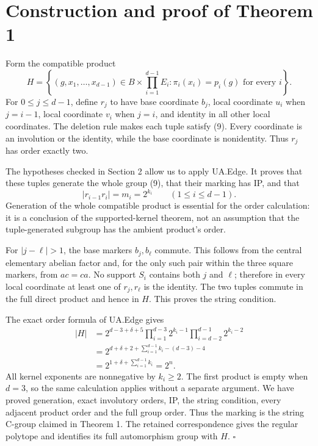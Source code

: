 \section{Construction and proof of Theorem 1}\label{construction-and-proof-of-theorem-1}
Form the compatible product \[
H=\left\{(g,x_1,\ldots,x_{d-1})\in B\times\prod_{i=1}^{d-1}E_i:
\pi_i(x_i)=p_i(g)\text{ for every }i\right\}.
\tag{9}
\] For \(0\le j\le d-1\), define \(r_j\) to have base coordinate
\(b_j\), local coordinate \(u_i\) when \(j=i-1\), local coordinate
\(v_i\) when \(j=i\), and identity in all other local coordinates. The
deletion rule makes each tuple satisfy (9). Every coordinate is an
involution or the identity, while the base coordinate is nonidentity.
Thus \(r_j\) has order exactly two.

The hypotheses checked in Section 2 allow us to apply UA.Edge. It proves
that these tuples generate the whole group (9), that their marking has
IP, and that \[
|r_{i-1}r_i|=m_i=2^{k_i}\qquad(1\le i\le d-1).
\tag{10}
\] Generation of the whole compatible product is essential for the order
calculation: it is a conclusion of the supported-kernel theorem, not an
assumption that the tuple-generated subgroup has the ambient product's
order.

For \(|j-\ell|>1\), the base markers \(b_j,b_\ell\) commute. This
follows from the central elementary abelian factor and, for the only
such pair within the three square markers, from \(ac=ca\). No support
\(S_i\) contains both \(j\) and \(\ell\); therefore in every local
coordinate at least one of \(r_j,r_\ell\) is the identity. The two
tuples commute in the full direct product and hence in \(H\). This
proves the string condition.

The exact order formula of UA.Edge gives \[
\begin{aligned}
|H|
&=2^{d-3+\delta+5}
  \prod_{i=1}^{d-3}2^{k_i-1}
  \prod_{i=d-2}^{d-1}2^{k_i-2}\\
&=2^{d+\delta+2+\sum_{i=1}^{d-1}k_i-(d-3)-4}\\
&=2^{1+\delta+\sum_{i=1}^{d-1}k_i}
 =2^n.
\end{aligned}
\tag{11}
\] All kernel exponents are nonnegative by \(k_i\ge2\). The first
product is empty when \(d=3\), so the same calculation applies without a
separate argument. We have proved generation, exact involutory orders,
IP, the string condition, every adjacent product order and the full
group order. Thus the marking is the string C-group claimed in Theorem
1. The retained correspondence gives the regular polytope and identifies
its full automorphism group with \(H\). \(\square\)

